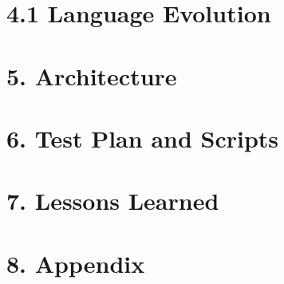 \documentclass[11pt]{article}
\begin{document}
\section*{4.1 Language Evolution}

\newpage

\section*{5. Architecture}

\newpage

\section*{6. Test Plan and Scripts}

\newpage

\section*{7. Lessons Learned}

\newpage

\section*{8. Appendix}

\newpage
\end{document}
